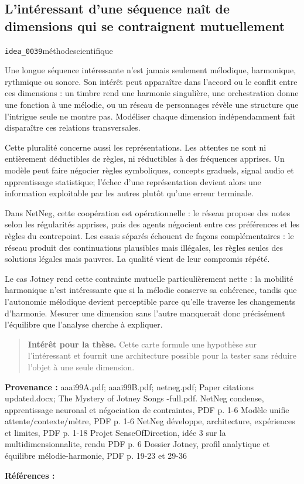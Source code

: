 \documentclass[10pt,a4paper]{article}
\begin{document}
\subsection{L'intéressant d'une séquence naît de dimensions qui se contraignent mutuellement}
{\small\color{metadata} \texttt{idea\_0039}\quad\textbullet\quad méthode\quad\textbullet\quad scientifique\par}

Une longue séquence intéressante n'est jamais seulement mélodique, harmonique, rythmique ou sonore. Son intérêt peut apparaître dans l'accord ou le conflit entre ces dimensions : un timbre rend une harmonie singulière, une orchestration donne une fonction à une mélodie, ou un réseau de personnages révèle une structure que l'intrigue seule ne montre pas. Modéliser chaque dimension indépendamment fait disparaître ces relations transversales.

Cette pluralité concerne aussi les représentations. Les attentes ne sont ni entièrement déductibles de règles, ni réductibles à des fréquences apprises. Un modèle peut faire négocier règles symboliques, concepts graduels, signal audio et apprentissage statistique; l'échec d'une représentation devient alors une information exploitable par les autres plutôt qu'une erreur terminale.

Dans NetNeg, cette coopération est opérationnelle : le réseau propose des notes selon les régularités apprises, puis des agents négocient entre ces préférences et les règles du contrepoint. Les essais séparés échouent de façons complémentaires : le réseau produit des continuations plausibles mais illégales, les règles seules des solutions légales mais pauvres. La qualité vient de leur compromis répété.

Le cas Jotney rend cette contrainte mutuelle particulièrement nette : la mobilité harmonique n'est intéressante que si la mélodie conserve sa cohérence, tandis que l'autonomie mélodique devient perceptible parce qu'elle traverse les changements d'harmonie. Mesurer une dimension sans l'autre manquerait donc précisément l'équilibre que l'analyse cherche à expliquer.

\begin{quote}
\textbf{Intérêt pour la thèse.} Cette carte formule une hypothèse sur l'intéressant et fournit une architecture possible pour la tester sans réduire l'objet à une seule dimension.
\end{quote}
{\footnotesize\color{metadata}\textbf{Provenance :} aaai99A.pdf; aaai99B.pdf; netneg.pdf; Paper citations updated.docx; The Mystery of Jotney Songs -full.pdf. NetNeg condense, apprentissage neuronal et négociation de contraintes, PDF p. 1-6 Modèle unifie attente/contexte/mètre, PDF p. 1-6 NetNeg développe, architecture, expériences et limites, PDF p. 1-18 Projet SenseOfDirection, idée 3 sur la multidimensionnalite, rendu PDF p. 6 Dossier Jotney, profil analytique et équilibre mélodie-harmonie, PDF p. 19-23 et 29-36\par}
{\footnotesize\color{metadata}\textbf{Références :} \parencite{gang1999unified,goldman1999netneg}\par}
\end{document}
